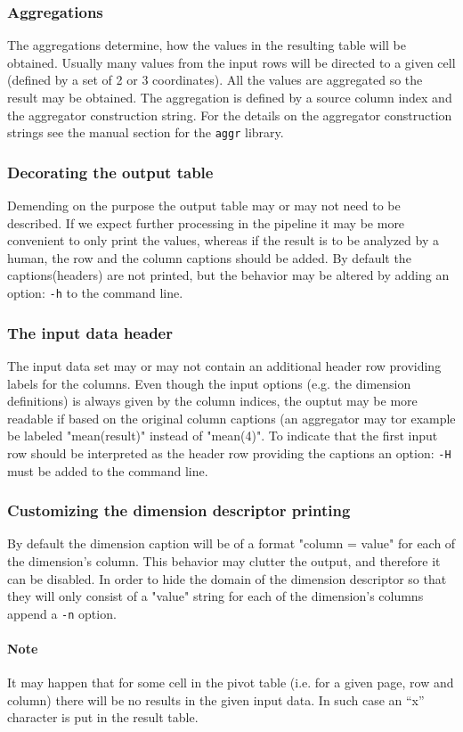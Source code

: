 	\subsubsection{Aggregations}
	The aggregations determine, how the values in the resulting table will be obtained.
	Usually many values from the input rows will be directed to a given cell (defined
	by a set of 2 or 3 coordinates). All the values are aggregated so the result may
	be obtained. The aggregation is defined by a source column index and the aggregator
	construction string. For the details on the aggregator construction strings see
	the manual section for the \texttt{aggr} library.

	\subsubsection{Decorating the output table}
	Demending on the purpose the output table may or may not need to be described. If
	we expect further processing in the pipeline it may be more convenient to only
	print the values, whereas if the result is to be analyzed by a human, the row and
	the column captions should be added. By default the captions(headers) are not
	printed, but the behavior may be altered by adding an option: \texttt{-h} to the
	command line.

	\subsubsection{The input data header}
	The input data set may or may not contain an additional header row providing
	labels for the columns. Even though the input options (e.g. the dimension
	definitions) is always given by the column indices, the ouptut may be more
	readable if based on the original column captions (an aggregator may tor example
	be labeled "mean(result)" instead of "mean(4)". To indicate that the first input
	row should be interpreted as the header row providing the captions an option:
	\texttt{-H} must be added to the command line.

	\subsubsection{Customizing the dimension descriptor printing}
	By default the dimension caption will be of a format "column = value" for each
	of the dimension's column. This behavior may clutter the output, and therefore
	it can be disabled. In order to hide the domain of the dimension descriptor so that
	they will only consist of a "value" string for each of the dimension's columns
	append a \texttt{-n} option.

	\paragraph{Note}
	It may happen that for some cell in the pivot table (i.e. for a given page, row
	and column) there will be no results in the given input data. In such case an
	``x'' character is put in the result table.
